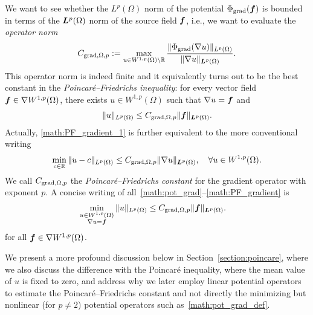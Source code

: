 \documentclass[10pt,a4paper]{article}
\newcommand\cye[1]{%
\protect\leavevmode
\begingroup
    \color{blue}%
    #1%
\endgroup
}
\begin{document}
We want to see whether the $L^{p}(\Omega)$ norm of the potential $\Phi_{\operatorname{grad}}( \bm{f} )$ is bounded in terms of the $\bm{L}^{p}(\Omega)$ norm of the source field $\bm{f}$, i.e., we want to evaluate the \emph{operator norm}
\begin{align}\label{math:pot_grad_norm}
    C_{\operatorname{grad},\Omega,p} := \max\limits_{ u \in W^{1,p}(\Omega) \setminus {\mathbb R} } 
    \frac{ \| \Phi_{\operatorname{grad}}(\nabla u) \|_{L^{p}(\Omega)} }{ \| \nabla u \|_{\bm{L}^{p}(\Omega)} }.
\end{align}
This operator norm is indeed finite and it equivalently turns out to be the best constant in the {\em Poincar\'e--Friedrichs inequality}: for every vector field $\bm{f} \in \nabla W^{1,p}(\Omega)$, there exists $u \in W^{1,p}(\Omega)$ such that $\nabla u = \bm{f}$ and 
\begin{align} \label{math:PF_gradient_1}
    \| u \|_{L^{p}(\Omega)}
    \leq 
    C_{\operatorname{grad},\Omega,p} 
    \| \bm{f} \|_{\bm{L}^{p}(\Omega)}.
\end{align}
Actually, \eqref{math:PF_gradient_1} is further equivalent to the more conventional writing
\begin{align} \label{math:PF_gradient_2}
    \min_{ c \in {\mathbb R} } \| u - c \|_{L^{p}(\Omega)}
    \leq 
    C_{\operatorname{grad},\Omega,p}
    \| \nabla u \|_{\bm{L}^{p}(\Omega)},
    \quad 
    \forall 
    u \in W^{1,p}(\Omega)
    .
\end{align}
We call $C_{\operatorname{grad},\Omega,p}$ the \emph{Poincar\'e--Friedrichs constant} for the gradient operator with exponent $p$. \cye{A concise writing of all~\eqref{math:pot_grad}--\eqref{math:PF_gradient} is
\begin{align} \label{math:pot_PF_grad}
    \min\limits_{ \substack{ u \in W^{1,p}(\Omega) \\ \nabla u = \bm{f} } } 
    \| u \|_{L^{p}(\Omega)}
    &\leq 
    C_{\operatorname{grad},\Omega,p}
    \| \bm{f} \|_{\bm{L}^{p}(\Omega)}.
\end{align}
for all $\bm{f} \in \nabla W^{1,p}(\Omega)$.}

\cye{We present a more profound discussion below in Section~\ref{section:poincare}, where we also discuss the difference with the Poincar\'e inequality, where the mean value of $u$ is fixed to zero, and address why we later employ linear potential operators to estimate the Poincar\'e--Friedrichs constant and not directly the minimizing but nonlinear (for $p \neq 2$) potential operators such as~\eqref{math:pot_grad_def}.} 
\end{document}
